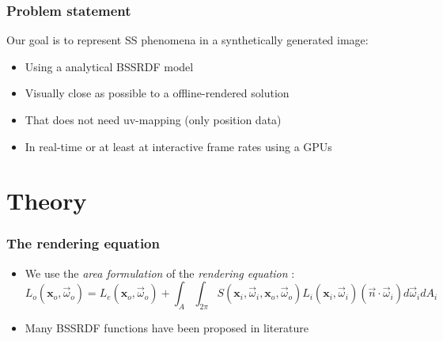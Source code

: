 \documentclass{beamer}
\newcommand{\vomega}{\vec{\omega}}
\newcommand{\x}{\mathbf{x}}
\begin{document}
\begin{frame}
    \frametitle{Problem statement}
		Our goal is to represent SS phenomena in a synthetically generated image:
		\vspace{0.5cm}
		\begin{itemize}
			\item Using a analytical BSSRDF model \citep{IMM2013-06646}  
			\item Visually close as possible to a offline-rendered solution
			\item That does not need uv-mapping (only position data)
			\item In real-time or at least at interactive frame rates using a GPUs
		\end{itemize}
\end{frame}


\section{Theory}

\begin{frame}
    \frametitle{The rendering equation}
			\begin{itemize}
				\item We use the \emph{area formulation} of the \emph{rendering equation} \citep{Jensen:2001:PMS:383259.383319}:
				$$L_o(\x_o,\vomega_o) = L_e(\x_o,\vomega_o) + \int_A \int_{2\pi} S(\x_i, \vomega_i, \x_o, \vomega_o) L_i(\x_i,\vomega_i) (\vec{n} \cdot \vomega_i) d\vomega_i d A_i$$
				\item Many BSSRDF functions have been proposed in literature \citep{Jensen:2001:PMS:383259.383319,D'Eon:2011:QMR:1964921.1964951,IMM2013-06646}  
			\end{itemize}
\end{frame}
\end{document}
